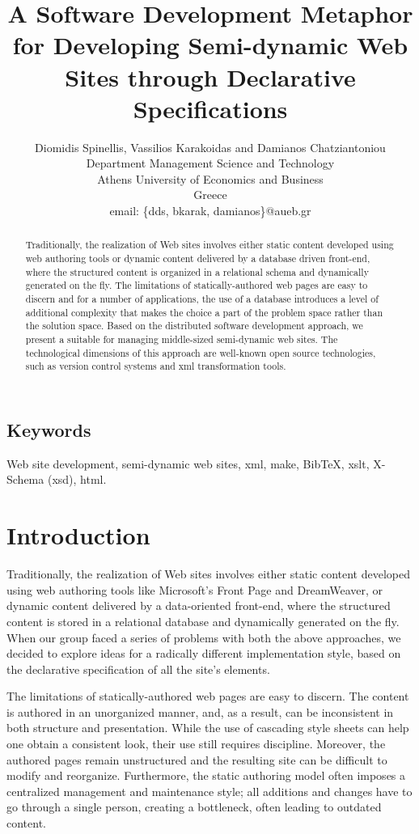 \documentclass[10pt]{article}
\title{A Software Development Metaphor for Developing Semi-dynamic Web Sites through Declarative Specifications}
\author{Diomidis Spinellis, Vassilios Karakoidas and Damianos Chatziantoniou\\
Department Management Science and Technology\\
Athens University of Economics and Business\\
Greece\\
email: \{dds, bkarak, damianos\}@aueb.gr}
\date{}
\begin{document}
\maketitle

\begin{abstract}
\noindent
Traditionally, the realization of Web sites involves either
static content developed using web authoring tools or dynamic
content delivered by a database driven front-end,
where the structured content is organized
in a relational schema and dynamically generated on the fly.
The limitations of statically-authored web pages are easy to discern and
for a number of applications, the use of a database
introduces a level of additional complexity that
makes the choice a part of the problem space rather than the solution space.
Based on the distributed software development approach, we present a suitable for managing 
middle-sized semi-dynamic web sites. The technological dimensions of this
approach are well-known open source technologies, such as version control systems
and {\sc xml} transformation tools.
\end{abstract}

\subsection*{Keywords}
Web site development, semi-dynamic web sites, {\sc xml}, make, {\sc BibTeX}, {\sc xslt}, {\sc X-Schema (xsd)}, {\sc html}.

\section{Introduction}
\label{sec:intro}
Traditionally, the realization of Web sites involves either
static content developed using web authoring tools like
Microsoft's Front Page and DreamWeaver, or dynamic
content delivered by a data-oriented front-end,
where the structured content is stored in a relational database 
and dynamically generated on the fly.
When our group faced a series of problems with both the above approaches,
we decided to explore ideas for a radically different
implementation style, based on the declarative specification
of all the site's elements.

The limitations of statically-authored web pages are easy to discern.
The content is authored in an unorganized manner, and, as a result,
can be inconsistent in both structure and presentation.
While the use of cascading style sheets can help one obtain a
consistent look, their use still requires discipline.
Moreover, the authored pages remain unstructured and the resulting
site can be difficult to modify and reorganize.
Furthermore, the static authoring model often imposes a centralized
management and maintenance style;
all additions and changes have to go through a single person,
creating a bottleneck, often leading to outdated content.
\end{document}

